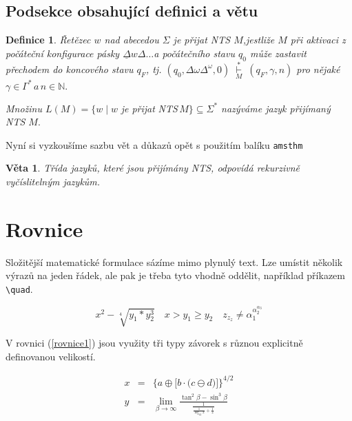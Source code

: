 \documentclass[11pt,a4paper,twocolumn]{article}
\newtheorem{definice}{Definice}
\newtheorem{theorem}{Věta}
\begin{document}
    \subsection{Podsekce obsahující definici a větu} \label{podsekce_mat_textu}
    
    \begin{definice}\label{def2}
        \textup{Řetězec} $w$ \textup{nad abecedou} $\Sigma$ \textup{je přijat NTS} $M$,\newline jestliže $M$ při aktivaci z počáteční konfigurace pásky $\underline{\Delta}w\Delta \dots$a počátečního stavu $q_0$ může zastavit přechodem do koncového stavu $q_F$, tj. $(q_0,\Delta\omega\Delta^\omega,0)\; \overset{*}{\underset{M}{\vdash}}\;(q_F,\gamma,n) $ pro nějaké $\gamma \in  \Gamma^*\, a \, n \in \mathbb{N}.$
        
        Množinu $ L(M) =\{w\;|\;w\,\,$je přijat\,\,NTS\,$M\} \subseteq \Sigma^* $ nazýváme \textup{jazyk přijímaný NTS} $M.$
    \end{definice}
    Nyní si vyzkoušíme sazbu vět a důkazů opět s použitím balíku \verb|amsthm|
    
    \begin{theorem}
        Třída jazyků, které jsou přijímány NTS, odpovídá \textup{rekurzivně vyčíslitelným jazykům.}
    \end{theorem}
    
    \section{Rovnice} \label{RovniceSec}
    Složitější matematické formulace sázíme mimo plynulý text. Lze umístit několik výrazů na jeden řádek, ale pak je třeba tyto vhodně oddělit, například příkazem \verb|\quad|.
    
    
    \begin{equation*}
         x^2 - \sqrt[4]{y_1 * y^{3}_{2}} \quad x > y_1 \geq y_2 \quad z_{z_{z}} \neq \alpha^{\alpha^{\alpha_{3}}_{2}}_{1}
    \end{equation*}
    
    V rovnici (\ref{rovnice1}) jsou využity tři typy závorek s různou explicitně definovanou velikostí.
    
    \begin{eqnarray}\label{rovnice1}
        x & = & \bigg\{
        a \oplus \Big[b \cdot \big(c \ominus d\big)\Big] 
        \bigg\}^{4/2}
        \\ \label{rovnice2}
        y & = & \lim_{\beta \to \infty} \frac{\tan^2\beta - \sin^3\beta}{\frac{1}{\frac{1}{\log_{42} x} + \frac{1}{2}}}
    \end{eqnarray}
    
\end{document}
